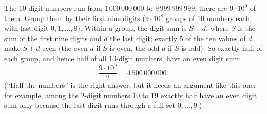 The $10$-digit numbers run from $1\,000\,000\,000$ to $9\,999\,999\,999$; there are $9\cdot10^9$ of them. Group them by their first nine digits ($9\cdot10^8$ groups of $10$ numbers each, with last digit $0,1,\ldots,9$). Within a group, the digit sum is $S+d$, where $S$ is the sum of the first nine digits and $d$ the last digit; exactly $5$ of the ten values of $d$ make $S+d$ even (the even $d$ if $S$ is even, the odd $d$ if $S$ is odd). So exactly half of each group, and hence half of all $10$-digit numbers, have an even digit sum:
\[\dfrac{9\cdot10^9}{2}=\boxed{4\,500\,000\,000}.\]
(``Half the numbers'' is the right answer, but it needs an argument like this one: for example, among the $2$-digit numbers $10$ to $19$ exactly half have an even digit sum only because the last digit runs through a full set $0,\ldots,9$.)
